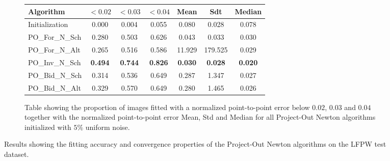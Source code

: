 \begin{figure}[p]
\begin{subfigure}{0.48\textwidth}
	    \label{fig:mean_cost_vs_iters2_po_n_5}
	\end{subfigure}
	\par\bigskip\bigskip
	\begin{subfigure}{\textwidth}
		\center
		\begin{tabular}{lcccccc}
		    \toprule
		    Algorithm & $<0.02$ & $<0.03$ & $<0.04$ & Mean & Sdt & Median 
		    \\
		    \midrule
		    Initialization & 0.000 & 0.004 & 0.055 & 0.080 & 0.028 & 0.078
		    \\ 
		    PO\_For\_N\_Sch & 0.280 & 0.503 & 0.626 & 0.043 & 0.033 & 0.030
		    \\
		    PO\_For\_N\_Alt & 0.265 & 0.516 & 0.586 & 11.929 & 179.525 & 0.029
		    \\
		    PO\_Inv\_N\_Sch & \textbf{0.494} & \textbf{0.744} & \textbf{0.826} & \textbf{0.030} & \textbf{0.028} & \textbf{0.020}
		    \\
		    PO\_Bid\_N\_Sch & 0.314 & 0.536 & 0.649 & 0.287 & 1.347 & 0.027
		    \\
		    PO\_Bid\_N\_Alt & 0.329 & 0.570 & 0.649 & 0.280 & 1.465 & 0.026
		    \\
		    \bottomrule
	  	\end{tabular}
	  	\caption{Table showing the proportion of images fitted with a normalized point-to-point error below $0.02$, $0.03$ and $0.04$ together with the normalized point-to-point error Mean, Std and Median for all Project-Out Newton algorithms initialized with $5\%$ uniform noise.}
	    \label{tab:stats_po_n_5}
	\end{subfigure}
	\caption{Results showing the fitting accuracy and convergence properties of the Project-Out Newton algorithms on the LFPW test dataset.}
	\label{fig:po_n_5}
\end{figure}


